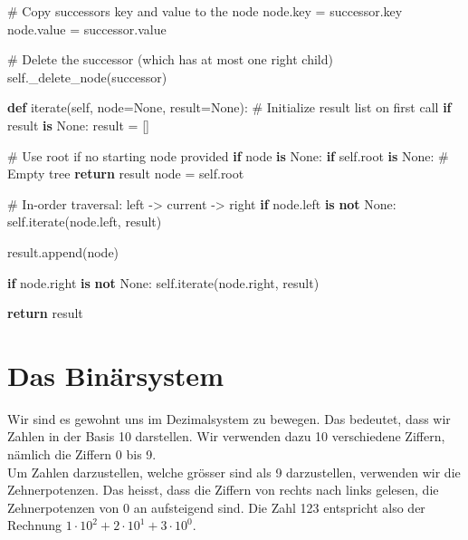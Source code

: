 \documentclass[
  nswissgerman,
  a4paper,
  DIV=11,
  numbers=noendperiod,
  ngerman]{scrreprt}
\newenvironment{Shaded}{\begin{snugshade}}{\end{snugshade}}
\newcommand{\CommentTok}[1]{\textcolor[rgb]{0.37,0.37,0.37}{#1}}
\newcommand{\ControlFlowTok}[1]{\textcolor[rgb]{0.00,0.23,0.31}{\textbf{#1}}}
\newcommand{\KeywordTok}[1]{\textcolor[rgb]{0.00,0.23,0.31}{\textbf{#1}}}
\newcommand{\NormalTok}[1]{\textcolor[rgb]{0.00,0.23,0.31}{#1}}
\newcommand{\OperatorTok}[1]{\textcolor[rgb]{0.37,0.37,0.37}{#1}}
\newcommand{\VariableTok}[1]{\textcolor[rgb]{0.07,0.07,0.07}{#1}}
\begin{document}
\begin{Shaded}
\begin{Highlighting}[numbers=left,,]
            \CommentTok{\# Copy successor\textquotesingle{}s key and value to the node}
\NormalTok{            node.key }\OperatorTok{=}\NormalTok{ successor.key}
\NormalTok{            node.value }\OperatorTok{=}\NormalTok{ successor.value}
            
            \CommentTok{\# Delete the successor (which has at most one right child)}
            \VariableTok{self}\NormalTok{.\_delete\_node(successor)}
        
    \KeywordTok{def}\NormalTok{ iterate(}\VariableTok{self}\NormalTok{, node}\OperatorTok{=}\VariableTok{None}\NormalTok{, result}\OperatorTok{=}\VariableTok{None}\NormalTok{):}
        \CommentTok{\# Initialize result list on first call}
        \ControlFlowTok{if}\NormalTok{ result }\KeywordTok{is} \VariableTok{None}\NormalTok{:}
\NormalTok{            result }\OperatorTok{=}\NormalTok{ []}
        
        \CommentTok{\# Use root if no starting node provided}
        \ControlFlowTok{if}\NormalTok{ node }\KeywordTok{is} \VariableTok{None}\NormalTok{:}
            \ControlFlowTok{if} \VariableTok{self}\NormalTok{.root }\KeywordTok{is} \VariableTok{None}\NormalTok{:  }\CommentTok{\# Empty tree}
                \ControlFlowTok{return}\NormalTok{ result}
\NormalTok{            node }\OperatorTok{=} \VariableTok{self}\NormalTok{.root}
        
        \CommentTok{\# In{-}order traversal: left {-}\textgreater{} current {-}\textgreater{} right}
        \ControlFlowTok{if}\NormalTok{ node.left }\KeywordTok{is} \KeywordTok{not} \VariableTok{None}\NormalTok{:}
            \VariableTok{self}\NormalTok{.iterate(node.left, result)}
        
\NormalTok{        result.append(node)}
        
        \ControlFlowTok{if}\NormalTok{ node.right }\KeywordTok{is} \KeywordTok{not} \VariableTok{None}\NormalTok{:}
            \VariableTok{self}\NormalTok{.iterate(node.right, result)}
        
        \ControlFlowTok{return}\NormalTok{ result}
\end{Highlighting}
\end{Shaded}

\chapter{Das Binärsystem}\label{das-binuxe4rsystem}

Wir sind es gewohnt uns im Dezimalsystem zu bewegen. Das bedeutet, dass
wir Zahlen in der Basis 10 darstellen. Wir verwenden dazu 10
verschiedene Ziffern, nämlich die Ziffern 0 bis 9.\\
Um Zahlen darzustellen, welche grösser sind als 9 darzustellen,
verwenden wir die Zehnerpotenzen. Das heisst, dass die Ziffern von
rechts nach links gelesen, die Zehnerpotenzen von 0 an aufsteigend sind.
Die Zahl 123 entspricht also der Rechnung
\(1 \cdot 10^2 + 2 \cdot 10^1 + 3 \cdot 10^0\).
\end{document}
